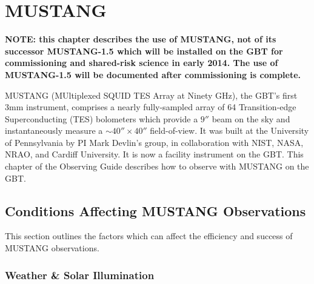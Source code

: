 \chapter{MUSTANG}\label{chap:mustang}

{\bf NOTE: this chapter describes the use of MUSTANG, not of its
  successor MUSTANG-1.5 which will be installed on the GBT for
  commissioning and shared-risk science in early 2014. The use of
  MUSTANG-1.5 will be documented after commissioning is complete.}

MUSTANG (MUltiplexed SQUID TES Array at Ninety GHz), the GBT's first
3mm instrument, comprises a nearly fully-sampled array of 64
Transition-edge Superconducting (TES) bolometers which provide a $9''$
beam on the sky and instantaneously measure a $\sim 40'' \times 40''$
field-of-view.  It was built at the University of Pennsylvania by PI
Mark Devlin's group, in collaboration with NIST, NASA, NRAO, and
Cardiff University. It is now a facility instrument on the GBT.  This
chapter of the Observing Guide describes how to observe with MUSTANG
on the GBT.


\section{Conditions Affecting MUSTANG Observations}\label{sec:mustangpreconditions}

This section outlines the factors which can affect the efficiency and
success of MUSTANG observations.

\subsection{Weather \& Solar Illumination}\label{sec:muswx}


